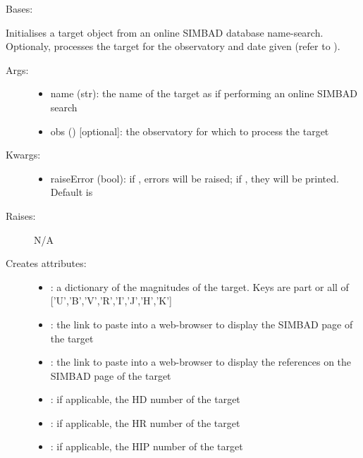 \documentclass[letterpaper,10pt,english]{sphinxmanual}
\begin{document}
\begin{fulllineitems}
\label{astroobs:astroobs.TargetSIMBAD}
Bases: 

Initialises a target object from an online SIMBAD database name-search. Optionaly, processes the target for the observatory and date given (refer to ).
\begin{description}
\item[{Args:}] \leavevmode\begin{itemize}
\item {} 
name (str): the name of the target as if performing an online SIMBAD search

\item {} 
obs () {[}optional{]}: the observatory for which to process the target

\end{itemize}

\item[{Kwargs:}] \leavevmode\begin{itemize}
\item {} 
raiseError (bool): if , errors will be raised; if , they will be printed. Default is 

\end{itemize}

\item[{Raises:}] \leavevmode
N/A

\item[{Creates attributes:}] \leavevmode\begin{itemize}
\item {} 
: a dictionary of the magnitudes of the target. Keys are part or all of {[}'U','B','V','R','I','J','H','K'{]}

\item {} 
: the link to paste into a web-browser to display the SIMBAD page of the target

\item {} 
: the link to paste into a web-browser to display the references on the SIMBAD page of the target

\item {} 
: if applicable, the HD number of the target

\item {} 
: if applicable, the HR number of the target

\item {} 
: if applicable, the HIP number of the target

\end{itemize}

\end{description}

\end{fulllineitems}
\end{document}
